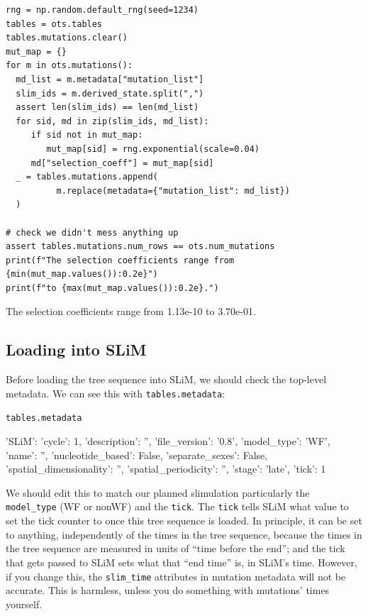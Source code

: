 \documentclass[12pt]{article}
\begin{document}
\begin{listing}[H]
    \begin{verbatim}
rng = np.random.default_rng(seed=1234)
tables = ots.tables
tables.mutations.clear()
mut_map = {}
for m in ots.mutations():
  md_list = m.metadata["mutation_list"]
  slim_ids = m.derived_state.split(",")
  assert len(slim_ids) == len(md_list)
  for sid, md in zip(slim_ids, md_list):
     if sid not in mut_map:
        mut_map[sid] = rng.exponential(scale=0.04)
     md["selection_coeff"] = mut_map[sid]
  _ = tables.mutations.append(
          m.replace(metadata={"mutation_list": md_list})
  )

# check we didn't mess anything up
assert tables.mutations.num_rows == ots.num_mutations
print(f"The selection coefficients range from {min(mut_map.values()):0.2e}")
print(f"to {max(mut_map.values()):0.2e}.")
  \end{verbatim}
\end{listing}
\begin{pycon}
The selection coefficients range from 1.13e-10 to 3.70e-01.
\end{pycon}

\subsection*{Loading into SLiM}
Before loading the tree sequence into SLiM,
we should check the top-level metadata.
We can see this with \verb|tables.metadata|:

\begin{listing}[H]
    \begin{verbatim}
tables.metadata
    \end{verbatim}
\end{listing}
\begin{pycon}
{
    'SLiM': {
        'cycle': 1, 
        'description': '', 
        'file_version': '0.8', 
        'model_type': 'WF', 
        'name': '', 
        'nucleotide_based': False, 
        'separate_sexes': False, 
        'spatial_dimensionality': '', 
        'spatial_periodicity': '', 
        'stage': 'late', 
        'tick': 1
        }
}
\end{pycon}

We should edit this to match our planned slimulation particularly the \verb|model_type| (WF or nonWF) and the \verb|tick|.
The \verb|tick| tells SLiM what value to set the tick counter to once this tree sequence is loaded.
In principle, it can be set to anything, independently of the times in the tree sequence,
because the times in the tree sequence are measured in units of “time before the end”;
and the tick that gets passed to SLiM sets what that “end time” is, in SLiM’s time.
However, if you change this, the \verb|slim_time| attributes in mutation metadata will not be accurate.
This is harmless, unless you do something with mutations’ times yourself.
\end{document}
